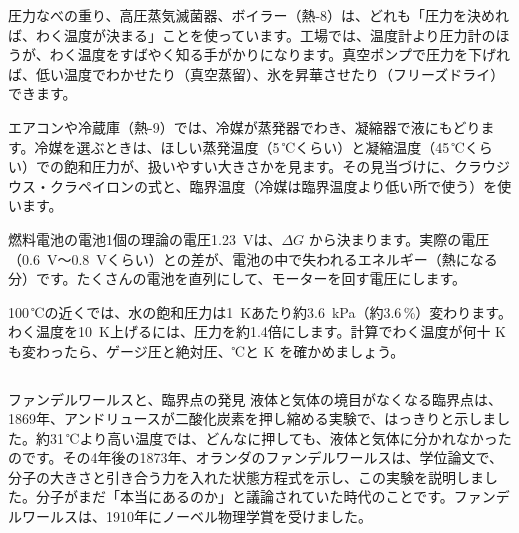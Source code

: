 \begin{phkougaku}
圧力なべの重り、高圧蒸気滅菌器、ボイラー（熱-8）は、どれも「圧力を決めれば、わく温度が決まる」ことを使っています。工場では、温度計より圧力計のほうが、わく温度をすばやく知る手がかりになります。真空ポンプで圧力を下げれば、低い温度でわかせたり（真空蒸留）、氷を昇華させたり（フリーズドライ）できます。

エアコンや冷蔵庫（熱-9）では、冷媒が蒸発器でわき、凝縮器で液にもどります。冷媒を選ぶときは、ほしい蒸発温度（5\,℃くらい）と凝縮温度（45\,℃くらい）での飽和圧力が、扱いやすい大きさかを見ます。その見当づけに、クラウジウス・クラペイロンの式と、臨界温度（冷媒は臨界温度より低い所で使う）を使います。

燃料電池の電池1個の理論の電圧\qty{1.23}{V}は、$\Delta G$ から決まります。実際の電圧（\qty{0.6}{V}〜\qty{0.8}{V}くらい）との差が、電池の中で失われるエネルギー（熱になる分）です。たくさんの電池を直列にして、モーターを回す電圧にします。

\begin{phketa}[わく温度と圧力の目安]
100\,℃の近くでは、水の飽和圧力は\qty{1}{K}あたり約\qty{3.6}{kPa}（約3.6\,\%）変わります。わく温度を\qty{10}{K}上げるには、圧力を約1.4倍にします。計算でわく温度が何十 K も変わったら、ゲージ圧と絶対圧、℃と K を確かめましょう。
\end{phketa}
\end{phkougaku}

\begin{column}{ファンデルワールスと、臨界点の発見}
液体と気体の境目がなくなる臨界点は、1869年、アンドリュースが二酸化炭素を押し縮める実験で、はっきりと示しました。約31\,℃より高い温度では、どんなに押しても、液体と気体に分かれなかったのです。その4年後の1873年、オランダのファンデルワールスは、学位論文で、分子の大きさと引き合う力を入れた状態方程式を示し、この実験を説明しました。分子がまだ「本当にあるのか」と議論されていた時代のことです。ファンデルワールスは、1910年にノーベル物理学賞を受けました。
\end{column}

